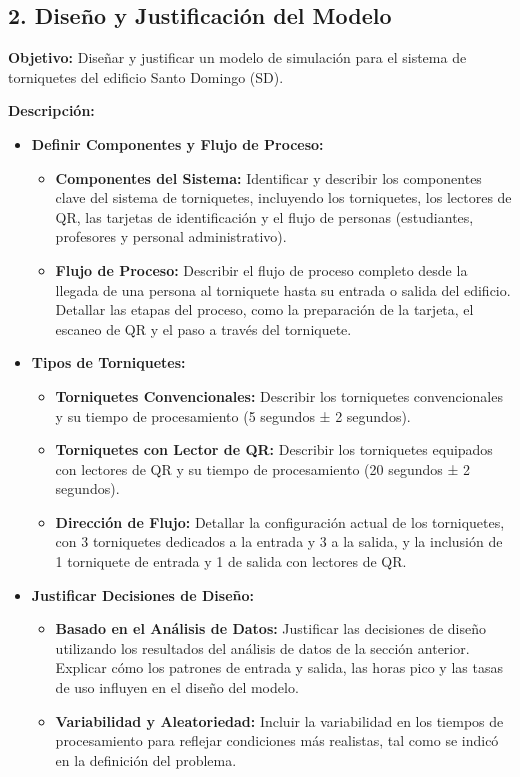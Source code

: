 \documentclass[12pt]{article}
\begin{document}
\subsection*{2. Diseño y Justificación del Modelo}
\textbf{Objetivo:} Diseñar y justificar un modelo de simulación para el sistema de torniquetes del edificio Santo Domingo (SD).

\textbf{Descripción:}
\begin{itemize}
    \item \textbf{Definir Componentes y Flujo de Proceso:}
    \begin{itemize}
        \item \textbf{Componentes del Sistema:} Identificar y describir los componentes clave del sistema de torniquetes, incluyendo los torniquetes, los lectores de QR, las tarjetas de identificación y el flujo de personas (estudiantes, profesores y personal administrativo).
        \item \textbf{Flujo de Proceso:} Describir el flujo de proceso completo desde la llegada de una persona al torniquete hasta su entrada o salida del edificio. Detallar las etapas del proceso, como la preparación de la tarjeta, el escaneo de QR y el paso a través del torniquete.
    \end{itemize}
    
    \item \textbf{Tipos de Torniquetes:}
    \begin{itemize}
        \item \textbf{Torniquetes Convencionales:} Describir los torniquetes convencionales y su tiempo de procesamiento (5 segundos ± 2 segundos).
        \item \textbf{Torniquetes con Lector de QR:} Describir los torniquetes equipados con lectores de QR y su tiempo de procesamiento (20 segundos ± 2 segundos).
        \item \textbf{Dirección de Flujo:} Detallar la configuración actual de los torniquetes, con 3 torniquetes dedicados a la entrada y 3 a la salida, y la inclusión de 1 torniquete de entrada y 1 de salida con lectores de QR.
    \end{itemize}
    
    \item \textbf{Justificar Decisiones de Diseño:}
    \begin{itemize}
        \item \textbf{Basado en el Análisis de Datos:} Justificar las decisiones de diseño utilizando los resultados del análisis de datos de la sección anterior. Explicar cómo los patrones de entrada y salida, las horas pico y las tasas de uso influyen en el diseño del modelo.
        \item \textbf{Variabilidad y Aleatoriedad:} Incluir la variabilidad en los tiempos de procesamiento para reflejar condiciones más realistas, tal como se indicó en la definición del problema.
    \end{itemize}
\end{itemize}
\end{document}
